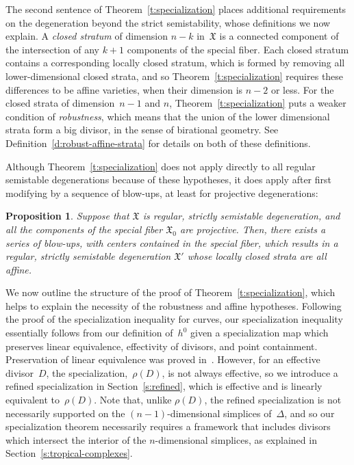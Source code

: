 \documentclass[11pt]{amsart}
\newtheorem{prop}[thm]{Proposition}
\theoremstyle{definition}
\newcommand{\defi}[1]{\emph{#1}}
\newcommand{\X}{\mathfrak X}
\begin{document}
The second sentence of Theorem~\ref{t:specialization} places additional
requirements on the degeneration beyond the strict semistability, whose
definitions we now explain. A \defi{closed stratum} of dimension $n-k$ in~$\X$
is a connected component of the intersection of any $k+1$ components of the
special fiber. Each closed stratum contains a corresponding locally closed
stratum, which is formed by removing all lower-dimensional closed
strata, and so Theorem~\ref{t:specialization} requires these differences
to be affine varieties, when their dimension is $n-2$ or less. For the closed
strata of dimension~$n-1$ and $n$, Theorem~\ref{t:specialization} puts a weaker
condition of \defi{robustness}, which means that the union of the lower
dimensional strata form a big divisor, in the sense of birational geometry. See
Definition~\ref{d:robust-affine-strata} for details on both of these
definitions.

Although Theorem~\ref{t:specialization} does not apply directly to all regular
semistable degenerations because of these hypotheses, it does apply after
first modifying by a sequence of blow-ups, at least for projective
degenerations:
\begin{prop}\label{p:blow-ups}
Suppose that $\X$ is regular, strictly semistable degeneration, and all the
components of the special fiber $\X_0$ are projective.
Then, there exists a series of blow-ups, with centers contained in the special
fiber, which results in a regular, strictly semistable degeneration $\X'$ whose
locally closed strata are all affine.
\end{prop}

We now outline the structure of the proof of Theorem~\ref{t:specialization},
which helps to explain the necessity of the robustness and affine hypotheses.
Following the proof of the specialization inequality for curves, our
specialization inequality essentially follows from our definition of~$h^0$ given
a specialization map which preserves linear equivalence, effectivity of
divisors, and point containment. Preservation of linear equivalence was proved
in~\cite{cartwright-complexes}. However, for an effective divisor~$D$, the
specialization,~$\rho(D)$, is not always effective, so we introduce a refined
specialization in Section~\ref{s:refined}, which is effective and is linearly
equivalent to~$\rho(D)$. Note that, unlike $\rho(D)$, the refined specialization
is not necessarily supported on the $(n-1)$-dimensional simplices of~$\Delta$,
and so our specialization theorem necessarily requires a framework that includes
divisors which intersect the interior of the $n$-dimensional simplices, as
explained in Section~\ref{s:tropical-complexes}.
\end{document}
